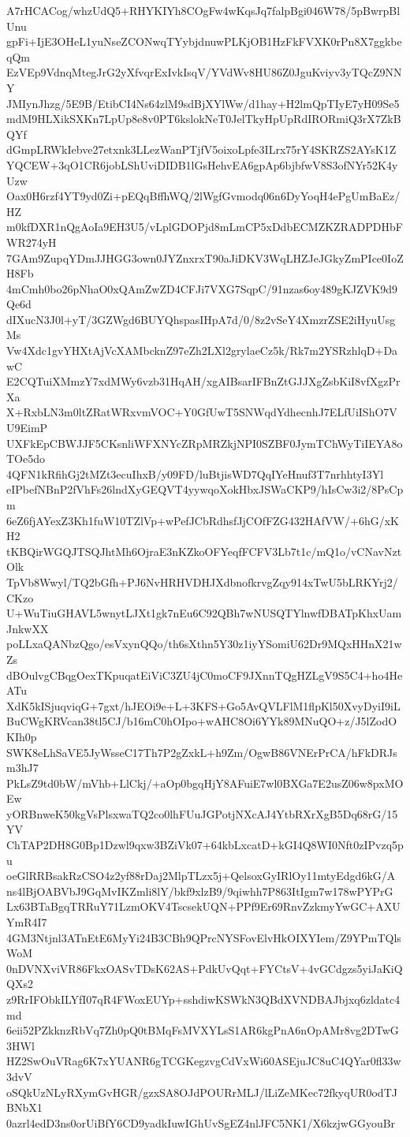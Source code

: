 A7rHCACog/whzUdQ5+RHYKIYh8COgFw4wKqsJq7falpBgi046W78/5pBwrpBlUnu
gpFi+IjE3OHeL1yuNseZCONwqTYybjdnuwPLKjOB1HzFkFVXK0rPn8X7ggkbeqQm
EzVEp9VdnqMtegJrG2yXfvqrExIvkIsqV/YVdWv8HU86Z0JguKviyv3yTQcZ9NNY
JMIynJhzg/5E9B/EtibCI4Ns64zlM9sdBjXYlWw/d1hay+H2lmQpTIyE7yH09Se5
mdM9HLXikSXKn7LpUp8e8v0PT6kslokNeT0JelTkyHpUpRdIRORmiQ3rX7ZkBQYf
dGmpLRWkIebve27etxnk3LLezWanPTjfV5oixoLpfe3ILrx75rY4SKRZS2AYsK1Z
YQCEW+3qO1CR6jobLShUviDIDB1lGsHehvEA6gpAp6bjbfwV8S3ofNYr52K4yUzw
Oax0H6rzf4YT9yd0Zi+pEQqBffhWQ/2lWgfGvmodq06n6DyYoqH4ePgUmBaEz/HZ
m0kfDXR1nQgAoIa9EH3U5/vLplGDOPjd8mLmCP5xDdbECMZKZRADPDHbFWR274yH
7GAm9ZupqYDmJJHGG3own0JYZnxrxT90aJiDKV3WqLHZJeJGkyZmPIce0IoZH8Fb
4mCmh0bo26pNhaO0xQAmZwZD4CFJi7VXG7SqpC/91nzas6oy489gKJZVK9d9Qe6d
dIXucN3J0l+yT/3GZWgd6BUYQhspasIHpA7d/0/8z2vSeY4XmzrZSE2iHyuUsgMs
Vw4Xdc1gvYHXtAjVcXAMbcknZ97eZh2LXl2grylaeCz5k/Rk7m2YSRzhlqD+DawC
E2CQTuiXMmzY7xdMWy6vzb31HqAH/xgAIBsarIFBnZtGJJXgZsbKiI8vfXgzPrXa
X+RxbLN3m0ltZRatWRxvmVOC+Y0GfUwT5SNWqdYdhecnhJ7ELfUiIShO7VU9EimP
UXFkEpCBWJJF5CKsnliWFXNYcZRpMRZkjNPI0SZBF0JymTChWyTiIEYA8oTOe5do
4QFN1kRfihGj2tMZt3ecuIhxB/y09FD/luBtjisWD7QqIYeHnuf3T7nrhhtyI3Yl
eIPbefNBnP2fVhFs26lndXyGEQVT4yywqoXokHbxJSWaCKP9/hIsCw3i2/8PsCpm
6eZ6fjAYexZ3Kh1fuW10TZlVp+wPefJCbRdhsfJjCOfFZG432HAfVW/+6hG/xKH2
tKBQirWGQJTSQJhtMh6OjraE3nKZkoOFYeqfFCFV3Lb7t1c/mQ1o/vCNavNztOlk
TpVb8Wwyl/TQ2bGfh+PJ6NvHRHVDHJXdbnofkrvgZqy914xTwU5bLRKYrj2/CKzo
U+WuTiuGHAVL5wnytLJXt1gk7nEu6C92QBh7wNUSQTYlnwfDBATpKhxUamJnkwXX
poLLxaQANbzQgo/esVxynQQo/th6sXthn5Y30z1iyYSomiU62Dr9MQxHHnX21wZs
dBOulvgCBqgOexTKpuqatEiViC3ZU4jC0moCF9JXnnTQgHZLgV9S5C4+ho4HeATu
XdK5kISjuqviqG+7gxt/hJEOi9e+L+3KFS+Go5AvQVLFlM1flpKl50XvyDyiI9iL
BuCWgKRVcan38tl5CJ/b16mC0hOIpo+wAHC8Oi6YYk89MNuQO+z/J5lZodOKIh0p
SWK8eLhSaVE5JyWsseC17Th7P2gZxkL+h9Zm/OgwB86VNErPrCA/hFkDRJsm3hJ7
PkLsZ9td0bW/mVhb+LlCkj/+aOp0bgqHjY8AFuiE7wl0BXGa7E2usZ06w8pxMOEw
yORBnweK50kgVsPlsxwaTQ2co0lhFUuJGPotjNXcAJ4YtbRXrXgB5Dq68rG/15YV
ChTAP2DH8G0Bp1Dzwl9qxw3BZiVk07+64kbLxcatD+kGI4Q8WI0Nft0zIPvzq5pu
oeGlRRBsakRzCSO4z2yf88rDaj2MlpTLzx5j+QelsoxGyIRlOy11mtyEdgd6kG/A
ns4lBjOABVbJ9GqMvIKZmli8lY/bkf9xlzB9/9qiwhh7P863ItIgm7w178wPYPrG
Lx63BTaBgqTRRuY71LzmOKV4TscsekUQN+PPf9Er69RnvZzkmyYwGC+AXUYmR4I7
4GM3Ntjnl3ATnEtE6MyYi24B3CBh9QPrcNYSFovElvHkOIXYIem/Z9YPmTQlsWoM
0nDVNXviVR86FkxOASvTDsK62AS+PdkUvQqt+FYCtsV+4vGCdgzs5yiJaKiQQXs2
z9RrIFObkILYfI07qR4FWoxEUYp+sshdiwKSWkN3QBdXVNDBAJbjxq6zldatc4md
6eii52PZkknzRbVq7Zh0pQ0tBMqFsMVXYLsS1AR6kgPnA6nOpAMr8vg2DTwG3HWl
HZ2SwOuVRag6K7xYUANR6gTCGKegzvgCdVxWi60ASEjuJC8uC4QYar0fl33w3dvV
oSQkUzNLyRXymGvHGR/gzxSA8OJdPOURrMLJ/lLiZeMKec72fkyqUR0odTJBNbX1
0azrl4edD3ns0orUiBfY6CD9yadkIuwIGhUvSgEZ4nlJFC5NK1/X6kzjwGGyouBr
